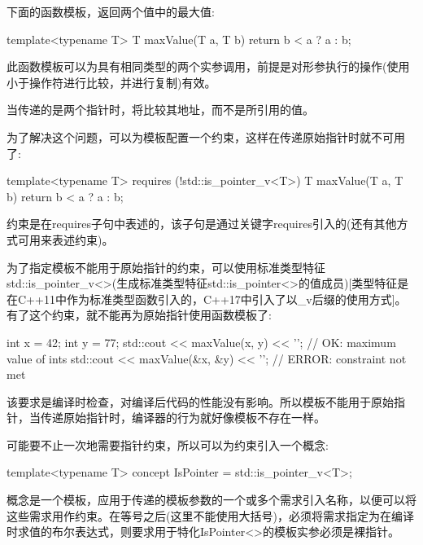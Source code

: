 

下面的函数模板，返回两个值中的最大值:

\begin{cpp}
template<typename T>
T maxValue(T a, T b) {
	return b < a ? a : b;
}
\end{cpp}

此函数模板可以为具有相同类型的两个实参调用，前提是对形参执行的操作(使用小于操作符进行比较，并进行复制)有效。

当传递的是两个指针时，将比较其地址，而不是所引用的值。



为了解决这个问题，可以为模板配置一个约束，这样在传递原始指针时就不可用了:

\begin{cpp}
template<typename T>
requires (!std::is_pointer_v<T>)
T maxValue(T a, T b)
{
	return b < a ? a : b;
}
\end{cpp}

约束是在requires子句中表述的，该子句是通过关键字requires引入的(还有其他方式可用来表述约束)。

为了指定模板不能用于原始指针的约束，可以使用标准类型特征std::is\_pointer\_v<>(生成标准类型特征std::is\_pointer<>的值成员)[类型特征是在C++11中作为标准类型函数引入的，C++17中引入了以\_v后缀的使用方式]。有了这个约束，就不能再为原始指针使用函数模板了:

\begin{cpp}
int x = 42;
int y = 77;
std::cout << maxValue(x, y) << '\n'; // OK: maximum value of ints
std::cout << maxValue(&x, &y) << '\n'; // ERROR: constraint not met
\end{cpp}

该要求是编译时检查，对编译后代码的性能没有影响。所以模板不能用于原始指针，当传递原始指针时，编译器的行为就好像模板不存在一样。


可能要不止一次地需要指针约束，所以可以为约束引入一个概念:

\begin{cpp}
template<typename T>
concept IsPointer = std::is_pointer_v<T>;
\end{cpp}

概念是一个模板，应用于传递的模板参数的一个或多个需求引入名称，以便可以将这些需求用作约束。在等号之后(这里不能使用大括号)，必须将需求指定为在编译时求值的布尔表达式，则要求用于特化IsPointer<>的模板实参必须是裸指针。

